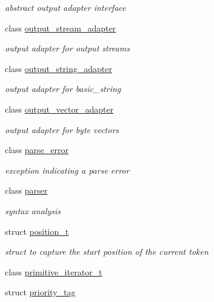 \begin{DoxyCompactItemize}
\begin{DoxyCompactList}\small\item\em abstract output adapter interface \end{DoxyCompactList}\item 
class \hyperlink{classnlohmann_1_1detail_1_1output__stream__adapter}{output\+\_\+stream\+\_\+adapter}
\begin{DoxyCompactList}\small\item\em output adapter for output streams \end{DoxyCompactList}\item 
class \hyperlink{classnlohmann_1_1detail_1_1output__string__adapter}{output\+\_\+string\+\_\+adapter}
\begin{DoxyCompactList}\small\item\em output adapter for basic\+\_\+string \end{DoxyCompactList}\item 
class \hyperlink{classnlohmann_1_1detail_1_1output__vector__adapter}{output\+\_\+vector\+\_\+adapter}
\begin{DoxyCompactList}\small\item\em output adapter for byte vectors \end{DoxyCompactList}\item 
class \hyperlink{classnlohmann_1_1detail_1_1parse__error}{parse\+\_\+error}
\begin{DoxyCompactList}\small\item\em exception indicating a parse error \end{DoxyCompactList}\item 
class \hyperlink{classnlohmann_1_1detail_1_1parser}{parser}
\begin{DoxyCompactList}\small\item\em syntax analysis \end{DoxyCompactList}\item 
struct \hyperlink{structnlohmann_1_1detail_1_1position__t}{position\+\_\+t}
\begin{DoxyCompactList}\small\item\em struct to capture the start position of the current token \end{DoxyCompactList}\item 
class \hyperlink{classnlohmann_1_1detail_1_1primitive__iterator__t}{primitive\+\_\+iterator\+\_\+t}
\item 
struct \hyperlink{structnlohmann_1_1detail_1_1priority__tag}{priority\+\_\+tag}
\item 

\end{DoxyCompactItemize}
